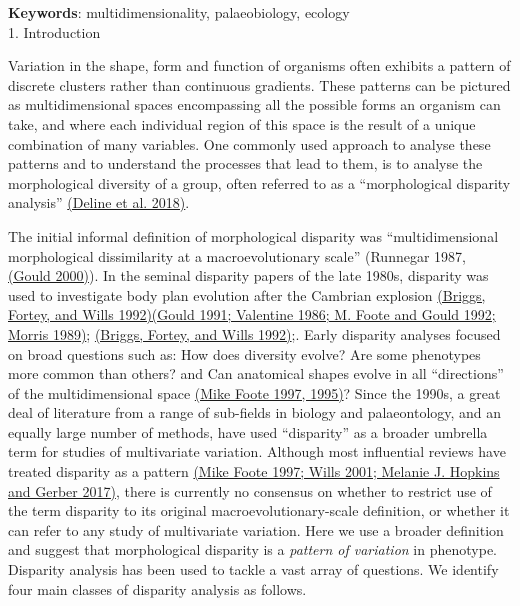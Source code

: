 \textbf{Keywords}: multidimensionality, palaeobiology, ecology\\

1. Introduction

Variation in the shape, form and function of organisms often exhibits a
pattern of discrete clusters rather than continuous gradients. These
patterns can be pictured as multidimensional spaces encompassing all the
possible forms an organism can take, and where each individual region of
this space is the result of a unique combination of many variables. One
commonly used approach to analyse these patterns and to understand the
processes that lead to them, is to analyse the morphological diversity
of a group, often referred to as a ``morphological disparity analysis''
\href{https://paperpile.com/c/sTGYvp/0y4V}{(Deline et al. 2018)}.

The initial informal definition of morphological disparity was
``multidimensional morphological dissimilarity at a macroevolutionary
scale'' (Runnegar 1987,
\href{https://paperpile.com/c/sTGYvp/Uns3}{(Gould 2000)}). In the
seminal disparity papers of the late 1980s, disparity was used to
investigate body plan evolution after the Cambrian explosion
\href{https://paperpile.com/c/sTGYvp/CiPy}{(Briggs, Fortey, and Wills
1992)}\href{https://paperpile.com/c/sTGYvp/CidX+6tNm+oenu+TtGs}{(Gould
1991; Valentine 1986; M. Foote and Gould 1992; Morris 1989)};
\href{https://paperpile.com/c/sTGYvp/CiPy}{(Briggs, Fortey, and Wills
1992)};. Early disparity analyses focused on broad questions such as:
How does diversity evolve? Are some phenotypes more common than others?
and Can anatomical shapes evolve in all ``directions'' of the
multidimensional space
\href{https://paperpile.com/c/sTGYvp/yqPw+fTJ3}{(Mike Foote 1997,
1995)}? Since the 1990s, a great deal of literature from a range of
sub-fields in biology and palaeontology, and an equally large number of
methods, have used ``disparity'' as a broader umbrella term for studies
of multivariate variation. Although most influential reviews have
treated disparity as a pattern
\href{https://paperpile.com/c/sTGYvp/yqPw+nFf7+vTHS}{(Mike Foote 1997;
Wills 2001; Melanie J. Hopkins and Gerber 2017)}, there is currently no
consensus on whether to restrict use of the term disparity to its
original macroevolutionary-scale definition, or whether it can refer to
any study of multivariate variation. Here we use a broader definition
and suggest that morphological disparity is a \emph{pattern of variation
}in phenotype. Disparity analysis has been used to tackle a vast array
of questions. We identify four main classes of disparity analysis as
follows.

